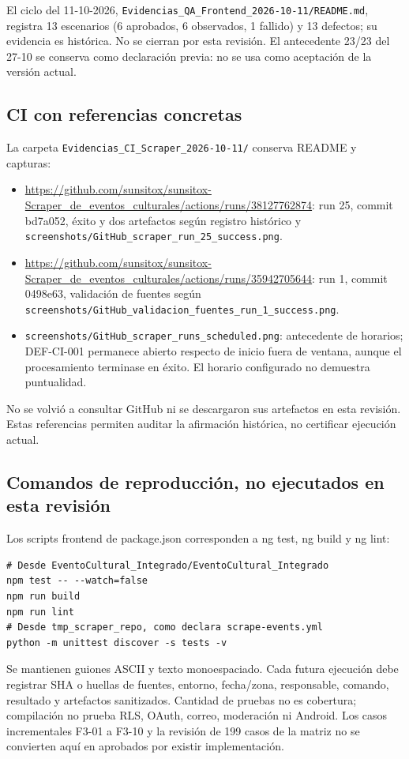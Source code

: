El ciclo del 11-10-2026, \nolinkurl{Evidencias_QA_Frontend_2026-10-11/README.md},
registra 13 escenarios (6 aprobados, 6 observados, 1 fallido) y 13 defectos; su evidencia
es histórica. No se cierran por esta revisión. El antecedente 23/23 del 27-10 se conserva
como declaración previa: no se usa como aceptación de la versión actual.

\subsection{CI con referencias concretas}
La carpeta \nolinkurl{Evidencias_CI_Scraper_2026-10-11/} conserva README y capturas:
\begin{itemize}[leftmargin=1.3em]
\item \url{https://github.com/sunsitox/sunsitox-Scraper_de_eventos_culturales/actions/runs/38127762874}:
run 25, commit bd7a052, éxito y dos artefactos según registro histórico y
\nolinkurl{screenshots/GitHub_scraper_run_25_success.png}.
\item \url{https://github.com/sunsitox/sunsitox-Scraper_de_eventos_culturales/actions/runs/35942705644}:
run 1, commit 0498e63, validación de fuentes según
\nolinkurl{screenshots/GitHub_validacion_fuentes_run_1_success.png}.
\item \nolinkurl{screenshots/GitHub_scraper_runs_scheduled.png}: antecedente de horarios;
DEF-CI-001 permanece abierto respecto de inicio fuera de ventana, aunque el procesamiento
terminase en éxito. El horario configurado no demuestra puntualidad.
\end{itemize}
No se volvió a consultar GitHub ni se descargaron sus artefactos en esta revisión.
Estas referencias permiten auditar la afirmación histórica, no certificar ejecución actual.

\subsection{Comandos de reproducción, no ejecutados en esta revisión}
Los scripts frontend de package.json corresponden a ng test, ng build y ng lint:
\begin{lstlisting}
# Desde EventoCultural_Integrado/EventoCultural_Integrado
npm test -- --watch=false
npm run build
npm run lint
# Desde tmp_scraper_repo, como declara scrape-events.yml
python -m unittest discover -s tests -v
\end{lstlisting}
Se mantienen guiones ASCII y texto monoespaciado. Cada futura ejecución debe registrar
SHA o huellas de fuentes, entorno, fecha/zona, responsable, comando, resultado y artefactos
sanitizados. Cantidad de pruebas no es cobertura; compilación no prueba RLS, OAuth,
correo, moderación ni Android. Los casos incrementales F3-01 a F3-10 y la revisión de
199 casos de la matriz no se convierten aquí en aprobados por existir implementación.

